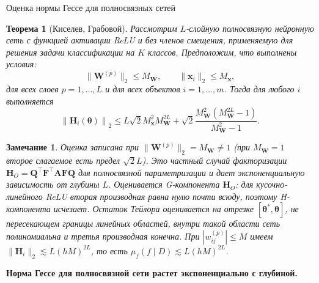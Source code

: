 \documentclass[9pt,pdf,hyperref={unicode}]{beamer}
\newtheorem{rustheorem}{Теорема}
\newtheorem{rusremark}{Замечание}
\newcommand{\key}[1]{\par\vspace{0.5ex}\noindent\textbf{\color{darkgreen}#1}}
\begin{document}
\begin{frame}{Оценка нормы Гессе для полносвязных сетей}
\justifying
\small
\begin{rustheorem}[Киселев, Грабовой]
    Рассмотрим $L$-слойную полносвязную нейронную сеть с функцией активации ReLU и без членов смещения, применяемую для решения задачи классификации на $K$ классов. Предположим, что выполнены условия:
    \[
        \| \mathbf{W}^{(p)} \|_2 \leqslant M_{\mathbf{W}}, \qquad \| \mathbf{x}_i \|_2 \leqslant M_{\mathbf{x}},
    \]
    для всех слоев $p = 1, \ldots, L$ и для всех объектов $i = 1, \ldots, m$. Тогда для любого $i$ выполняется
    \[
        \left\| \mathbf{H}_i(\boldsymbol{\theta}) \right\|_2 \leqslant L \sqrt{2} M_{\mathbf{x}}^2 M_{\mathbf{W}}^{2L} + \sqrt{2} \dfrac{M_{\mathbf{W}}^2 (M_{\mathbf{W}}^{2L} - 1)}{M_{\mathbf{W}}^2 - 1}.
    \]
\end{rustheorem}
\begin{rusremark}
    Оценка записана при $\|\mathbf{W}^{(p)}\|_2=M_{\mathbf{W}}\neq1$ (при $M_{\mathbf{W}}=1$ второе слагаемое есть предел $\sqrt2 L$). Это частный случай факторизации $\mathbf{H}_O=\mathbf{Q}^{\top}\mathbf{F}^{\top}\mathbf{A}\mathbf{F}\mathbf{Q}$ для полносвязной параметризации и дает экспоненциальную зависимость от глубины $L$. Оценивается G-компонента $\mathbf{H}_O$: для кусочно-линейного ReLU вторая производная равна нулю почти всюду, поэтому H-компонента исчезает. Остаток Тейлора оценивается на отрезке $[\boldsymbol{\theta}^*,\boldsymbol{\theta}]$, не пересекающем границы линейных областей, внутри такой области сеть полиномиальна и третья производная конечна. При $|w_{ij}^{(p)}|\le M$ имеем $\|\mathbf{H}_i\|_2\lesssim L(hM)^{2L}$, то есть $\mu_f(f\mid D)\lesssim L(hM)^{2L}$.
\end{rusremark}
\key{Норма Гессе для полносвязной сети растет экспоненциально с глубиной.}
\end{frame}
\end{document}
